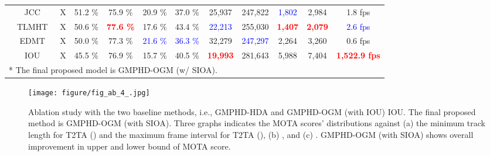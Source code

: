 \documentclass[journal]{IEEEtran}
\begin{document}
\begin{table*}[t]
\begin{tabular}{|c|c|c|ccccccccc|}
           & \footnotesize{JCC~\cite{jcc}} & \footnotesize{X}
           & \footnotesize{51.2 \%} &  \footnotesize{75.9 \%} &  \footnotesize{20.9 \%} &  \footnotesize{37.0 \%} &  \footnotesize{25,937} &  \footnotesize{247,822} &  \footnotesize{\textcolor{blue}{1,802}} &  \footnotesize{2,984} &  \footnotesize{1.8 fps}  \\ 

            
            & \footnotesize{TLMHT~\cite{tlmht}} & \footnotesize{X}
            & \footnotesize{50.6 \%} &  \footnotesize{\textbf{\textcolor{red}{77.6 \%}}} &  \footnotesize{17.6 \%} &  \footnotesize{43.4 \%} &  \footnotesize{\textcolor{blue}{22,213}} &  \footnotesize{255,030} &  \footnotesize{\textbf{\textcolor{red}{1,407}}} &  \footnotesize{\textbf{\textcolor{red}{2,079}}} &  \footnotesize{\textcolor{blue}{2.6 fps}}  \\
            
            & \footnotesize{EDMT~\cite{edmt}} & \footnotesize{X}
            & \footnotesize{50.0 \%} &  \footnotesize{77.3 \%} &  \footnotesize{\textcolor{blue}{21.6 \%}} &  \footnotesize{\textcolor{blue}{36.3 \%}} &  \footnotesize{32,279} &  \footnotesize{\textcolor{blue}{247,297}} &  \footnotesize{2,264} &  \footnotesize{3,260} &  \footnotesize{0.6 fps}  \\
            
             &\footnotesize{IOU~\cite{iou}} & \footnotesize{X}
             & \footnotesize{45.5 \%} &  \footnotesize{76.9 \%} &  \footnotesize{15.7 \%} &  \footnotesize{40.5 \%} &  \footnotesize{\textbf{\textcolor{red}{19,993}}} &  \footnotesize{281,643} &  \footnotesize{5,988} &  \footnotesize{7,404} &  \footnotesize{\textbf{\textcolor{red}{1,522.9 fps}}}  \\
            
            \hline
            \multicolumn{12}{l}{* The final proposed model is GMPHD-OGM (w/ SIOA).} \\
        \end{tabular}
\end{table*}


\begin{figure*}[h]
\centering
\texttt{[image: figure/fig\_ab\_4\_.jpg]}
\caption{Ablation study with the two baseline methods, i.e., GMPHD-HDA and GMPHD-OGM (with IOU) IOU. The final proposed method is GMPHD-OGM (with SIOA). Three graphs indicates the MOTA scores' distributions against (a) the minimum track length for T2TA () and the maximum frame interval for T2TA (), (b) , and (c) . GMPHD-OGM (with SIOA) shows overall improvement in upper and lower bound of MOTA score.}
\label{fig:ablation}
\end{figure*}
\end{document}
